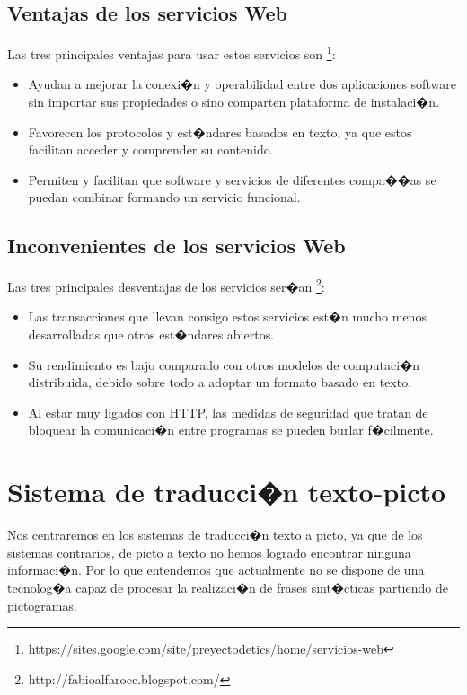 \subsection{Ventajas de los servicios Web}
Las tres principales ventajas para usar estos servicios son \footnote{https://sites.google.com/site/preyectodetics/home/servicios-web}:
\begin{itemize}
  \item Ayudan a mejorar la conexi�n y operabilidad entre dos aplicaciones software sin importar sus propiedades o sino comparten plataforma de instalaci�n.
  \item Favorecen los protocolos y est�ndares basados en texto, ya que estos facilitan acceder y comprender su contenido.
  \item Permiten y facilitan que software y servicios de diferentes compa��as se puedan combinar formando un servicio funcional.      
\end{itemize}

\subsection{Inconvenientes de los servicios Web}
Las tres principales desventajas de los servicios ser�an  \footnote{http://fabioalfarocc.blogspot.com/}:
\begin{itemize}
  \item Las transacciones que llevan consigo estos servicios est�n mucho menos desarrolladas que otros est�ndares abiertos.
  \item Su rendimiento es bajo comparado con otros modelos de computaci�n distribuida, debido sobre todo a adoptar un formato basado en texto.
  \item Al estar muy ligados con HTTP, las medidas de seguridad que tratan de bloquear la comunicaci�n entre programas se pueden burlar f�cilmente.
\end{itemize} 

\section{Sistema de traducci�n texto-picto}
\label{cap2:sec:Sistema de traducci�n texto-picto}
Nos centraremos en los sistemas de traducci�n texto a picto, ya que de los sistemas contrarios, de picto a texto no hemos logrado encontrar ninguna informaci�n. Por lo que entendemos que actualmente no se dispone de una tecnolog�a capaz de procesar la realizaci�n de frases sint�cticas partiendo de pictogramas.  

